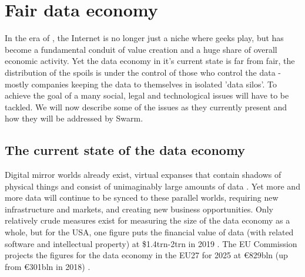 \section{Fair data economy  \statusgreen}\label{sec:fair-data}
\green{}

In the era of , the Internet is no longer just a niche where geeks play, but has become a fundamental conduit of value creation and a huge share of overall economic activity. Yet the data economy in it's current state is far from fair, the distribution of the spoils is under the control of those who control the data - mostly companies keeping the data to themselves in isolated 'data silos'. To achieve the goal of a  many social, legal and technological issues will have to be tackled. We will now describe some of the issues as they  currently present and how they will be addressed by Swarm. 

\subsection{The current state of the data economy  \statusgreen} \label{sec:dataeconomy}

Digital mirror worlds already exist, virtual expanses that contain shadows of physical things and consist of unimaginably large amounts of data \cite{MirrorWorlds2020Feb}. Yet more and more data will continue to be synced to these parallel worlds, requiring new infrastructure and markets, and creating new business opportunities. Only relatively crude measures exist for measuring the size of the data economy as a whole, but for the USA, one figure puts the financial value of data (with related software and intellectual property) at \$1.4trn-2trn in 2019 \cite{MirrorWorlds2020Feb}. The EU Commission projects the figures for the data economy in the EU27 for 2025 at €829bln (up from €301bln in 2018) \cite{EUDataStrategy2020Feb}. 

